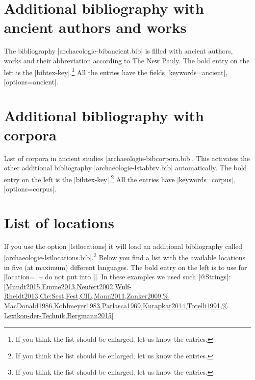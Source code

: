 \documentclass[a4paper,
10pt,
greek,
french,
spanish,
italian,
ngerman,
english
]{ltxdoc}
\begin{document}
\section{Additional bibliography with ancient authors and works}\label{list-bibancient}
The bibliography |archaeologie-bibancient.bib| is filled with ancient authors, works and their abbreviation according to  The New Pauly.
The bold entry on the left is the |bibtex-key|.\footnote{If you think the list should be enlarged, let us know the entries.}
All the entries have the fields  |keywords={ancient}|, |options={ancient}|.

\begin{multicols}{2}
	
\end{multicols}


\section{Additional bibliography with corpora}\label{list-bibcorpora}
List of corpora in ancient studies |archaeologie-bibcorpora.bib|.
This activates the other additional bibliography |archaeologie-lstabbrv.bib| automatically.
The bold entry on the left is the |bibtex-key|.\footnote{If you think the list should be enlarged, let us know the entries.}
All the entries have |keywords={corpus}|, |options={corpus}|.
\begin{multicols}{2}
	
\end{multicols}

\section{List of locations}\label{list-locations}
If you use the option |lstlocations| it will load an additional bibliography called |archaeologie-lstlocations.bib|.\footnote{If you think the list should be enlarged, let us know the entries.} 
Below you find a list with the available locations in five (at maximum) different languages.
The bold entry on the left is to use for |location=| -- do not put  into |{}|.
In these examples we used such |@Strings|:
\cref{Mundt2015,Emme2013,Neufert2002,Wulf-Rheidt2013,Cic:Sest,Fest,CIL,Mann2011,Zanker2009,%
MacDonald1986,Kohlmeyer1983,Parlasca1969,Kurapkat2014,Torelli1991,%
Lexikon-der-Technik,Bergmann2015}
\end{document}
